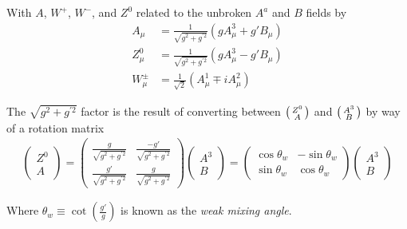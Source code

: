         With $A$, $W^+$, $W^-$, and $Z^0$ related to the unbroken $A^a$ and $B$ fields by
        \begin{equation} \begin{split}
            A_{\mu} & = \frac{1}{\sqrt{g^2 + g^{\prime 2}}} ( gA^3_{\mu} + g'B_{\mu} ) \\
            Z^0_{\mu} & = \frac{1}{\sqrt{g^2 + g^{\prime 2}}} ( gA^3_{\mu} - g'B_{\mu} ) \\
            W^{\pm}_{\mu} & = \frac{1}{\sqrt{2}} (A^1_{\mu} \mp iA^2_{\mu})
        \end{split} \end{equation}

        The $\sqrt{g^2 + g^{\prime 2}}$ factor is the result of converting between
            $\big(\begin{smallmatrix} Z^0 \\ A \end{smallmatrix}\big)$ and $\big(\begin{smallmatrix} A^3 \\ B \end{smallmatrix}\big)$ by way of a rotation matrix
        \begin{equation} \begin{split}
            \begin{pmatrix} Z^0 \\ A \end{pmatrix} =
            \begin{pmatrix}
                \frac{g}{\sqrt{g^2 + g^{\prime 2}}} & \frac{-g'}{\sqrt{g^2 + g^{\prime 2}}} \\
                \frac{g'}{\sqrt{g^2 + g^{\prime 2}}} & \frac{g}{\sqrt{g^2 + g^{\prime 2}}}
            \end{pmatrix} \begin{pmatrix} A^3 \\ B \end{pmatrix} = 
            \begin{pmatrix}
                \cos\theta_w & -\sin\theta_w \\
                \sin\theta_w & \cos\theta_w
            \end{pmatrix} \begin{pmatrix} A^3 \\ B \end{pmatrix}
        \end{split} \end{equation}

        Where $\theta_w \equiv \cot(\frac{g'}{g})$ is known as the \textit{weak mixing angle}.

